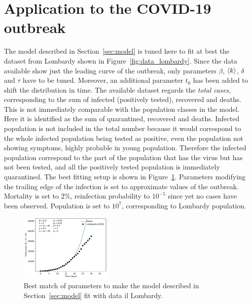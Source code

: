 \section{Application to the COVID-19 outbreak}

The model described in Section~\ref{sec:model} is tuned here to fit at best the dataset from Lombardy shown in Figure~\ref{fig:data_lombardy}. Since the data available show just the leading curve of the outbreak, only parameters $\beta$, $\braket{k}$, $\delta$ and $\tau$ have to be tuned. Moreover, an additional parameter $t_0$ has been added to shift the distribution in time. The available dataset regards the \emph{total cases}, corresponding to the sum of infected (positively tested), recovered and deaths. This is not immediately comparable with the population classes in the model. Here it is identified as the sum of quarantined, recovered and deaths. Infected population is not included in the total number because it would correspond to the whole infected population being tested as positive, even the population not showing symptoms, highly probable in young population. Therefore the infected population correspond to the part of the population that has the virus but has not been tested, and all the positively tested population is immediately quarantined. The best fitting setup is shown in Figure~\ref{fig:data_vs_model_first_lombardy}. Parameters modifying the trailing edge of the infection is set to approximate values of the outbreak. Mortality is set to $2\%$, reinfection probability to $10^{-5}$ since yet no cases have been observed. Population is set to $10^7$, corresponding to Lombardy population.\\

\begin{figure}
\centering
  \includegraphics[width=0.4\textwidth]{imgs/Covid/DataVsModel_parameters_Lombardia_less_impacting.pdf}
  \caption{Best match of parameters to make the model described in Section~\ref{sec:model} fit with data il Lombardy.}
  \label{fig:data_vs_model_first_lombardy}
\end{figure}

